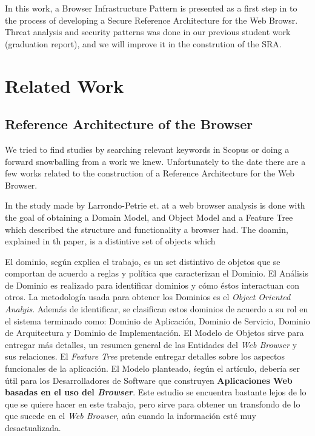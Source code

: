 \documentclass{sig-alternate-05-2015}
\begin{document}
In this work, a Browser Infrastructure Pattern is presented as a first step in to the process of developing a Secure Reference Architecture for the Web Browsr. Threat analysis and security patterns was done in our previous student work (graduation report), and we will improve it in the constrution of the SRA.

\section*{Related Work}
  \subsection*{Reference Architecture of the Browser}
  We tried to find studies by searching relevant keywords in Scopus or doing a forward snowballing from a work \cite{2005-grosskurth-browser-refarch} we knew. Unfortunately to the date there are a few works related to the construction of a Reference Architecture for the Web Browser.

  In the study made by Larrondo-Petrie et. at \cite{535061} a web browser analysis is done with the goal of obtaining a Domain Model, and Object Model and a Feature Tree which described the structure and functionality a browser had. The doamin, explained in th paper, is a distintive set of objects which 

  
  El dominio, según explica el trabajo, es un set distintivo de objetos que se comportan de acuerdo a reglas y política que caracterizan el Dominio. El Análisis de Dominio es realizado para identificar dominios y cómo éstos interactuan con otros. La metodología usada para obtener los Dominios es el \textit{Object Oriented Analyis}. Además de identificar, se clasifican estos dominios de acuerdo a su rol en el sistema terminado como: Dominio de Aplicación, Dominio de Servicio, Dominio de Arquitectura y Dominio de Implementación. El Modelo de Objetos sirve para entregar más detalles, un resumen general de las Entidades del \textit{Web Browser} y sus relaciones. El \textit{Feature Tree} pretende entregar detalles sobre los aspectos funcionales de la aplicación. El Modelo planteado, śegún el artículo, debería ser útil para los Desarrolladores de Software que construyen \textbf{Aplicaciones Web basadas en el uso del \textit{Browser}}.  Este estudio se encuentra bastante lejos de lo que se quiere hacer en este trabajo, pero sirve para obtener un transfondo de lo que sucede en el \textit{\textit{Web Browser}}, aún cuando la información esté muy desactualizada.
\end{document}
